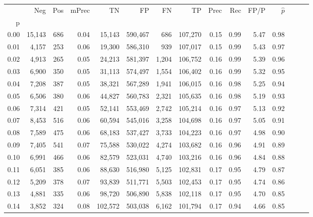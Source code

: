 \begin{tabular}{rrrrrrrrrrrrrrr}
\toprule
{} &     Neg &    Pos & mPrec &       TN &       FP &       FN &       TP &  Prec &   Rec &  FP/P & $\hat{p}$ \\
p    &         &        &       &          &          &          &          &       &       &       &           \\
\midrule
0.00 &  15,143 &    686 &  0.04 &   15,143 &  590,467 &      686 &  107,270 &  0.15 &  0.99 &  5.47 &      0.98 \\
0.01 &   4,157 &    253 &  0.06 &   19,300 &  586,310 &      939 &  107,017 &  0.15 &  0.99 &  5.43 &      0.97 \\
0.02 &   4,913 &    265 &  0.05 &   24,213 &  581,397 &    1,204 &  106,752 &  0.16 &  0.99 &  5.39 &      0.96 \\
0.03 &   6,900 &    350 &  0.05 &   31,113 &  574,497 &    1,554 &  106,402 &  0.16 &  0.99 &  5.32 &      0.95 \\
0.04 &   7,208 &    387 &  0.05 &   38,321 &  567,289 &    1,941 &  106,015 &  0.16 &  0.98 &  5.25 &      0.94 \\
0.05 &   6,506 &    380 &  0.06 &   44,827 &  560,783 &    2,321 &  105,635 &  0.16 &  0.98 &  5.19 &      0.93 \\
0.06 &   7,314 &    421 &  0.05 &   52,141 &  553,469 &    2,742 &  105,214 &  0.16 &  0.97 &  5.13 &      0.92 \\
0.07 &   8,453 &    516 &  0.06 &   60,594 &  545,016 &    3,258 &  104,698 &  0.16 &  0.97 &  5.05 &      0.91 \\
0.08 &   7,589 &    475 &  0.06 &   68,183 &  537,427 &    3,733 &  104,223 &  0.16 &  0.97 &  4.98 &      0.90 \\
0.09 &   7,405 &    541 &  0.07 &   75,588 &  530,022 &    4,274 &  103,682 &  0.16 &  0.96 &  4.91 &      0.89 \\
0.10 &   6,991 &    466 &  0.06 &   82,579 &  523,031 &    4,740 &  103,216 &  0.16 &  0.96 &  4.84 &      0.88 \\
0.11 &   6,051 &    385 &  0.06 &   88,630 &  516,980 &    5,125 &  102,831 &  0.17 &  0.95 &  4.79 &      0.87 \\
0.12 &   5,209 &    378 &  0.07 &   93,839 &  511,771 &    5,503 &  102,453 &  0.17 &  0.95 &  4.74 &      0.86 \\
0.13 &   4,881 &    335 &  0.06 &   98,720 &  506,890 &    5,838 &  102,118 &  0.17 &  0.95 &  4.70 &      0.85 \\
0.14 &   3,852 &    324 &  0.08 &  102,572 &  503,038 &    6,162 &  101,794 &  0.17 &  0.94 &  4.66 &      0.85 \\

\end{tabular}
